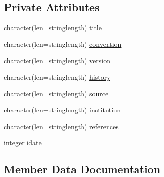 \subsection*{Private Attributes}
\begin{DoxyCompactItemize}
\item 
character(len=stringlength) \mbox{\hyperlink{structmoduleihradarformat_1_1t__netcdf__global__attributes_a202c1190d66a2e481c5e5a9218ec42b3}{title}}
\item 
character(len=stringlength) \mbox{\hyperlink{structmoduleihradarformat_1_1t__netcdf__global__attributes_ac54f7329d2b8c508f52ceb7c238da9c9}{convention}}
\item 
character(len=stringlength) \mbox{\hyperlink{structmoduleihradarformat_1_1t__netcdf__global__attributes_a216a59fd7843c452a8c8b5899264836c}{version}}
\item 
character(len=stringlength) \mbox{\hyperlink{structmoduleihradarformat_1_1t__netcdf__global__attributes_a33a61007ef80bda3b0351288ba5f2500}{history}}
\item 
character(len=stringlength) \mbox{\hyperlink{structmoduleihradarformat_1_1t__netcdf__global__attributes_aba14cc407b91c9b6e24a5a580c6dc081}{source}}
\item 
character(len=stringlength) \mbox{\hyperlink{structmoduleihradarformat_1_1t__netcdf__global__attributes_a743b4708ab8c489d225ae574819bbbf0}{institution}}
\item 
character(len=stringlength) \mbox{\hyperlink{structmoduleihradarformat_1_1t__netcdf__global__attributes_aa0e6d4e3d8686580ed7d2aa99c088a01}{references}}
\item 
integer \mbox{\hyperlink{structmoduleihradarformat_1_1t__netcdf__global__attributes_a843fc18e1b1b1ebcacad882d4b4a6df1}{idate}}
\end{DoxyCompactItemize}


\subsection{Member Data Documentation}
\mbox{\label{structmoduleihradarformat_1_1t__netcdf__global__attributes_ac54f7329d2b8c508f52ceb7c238da9c9}} 

